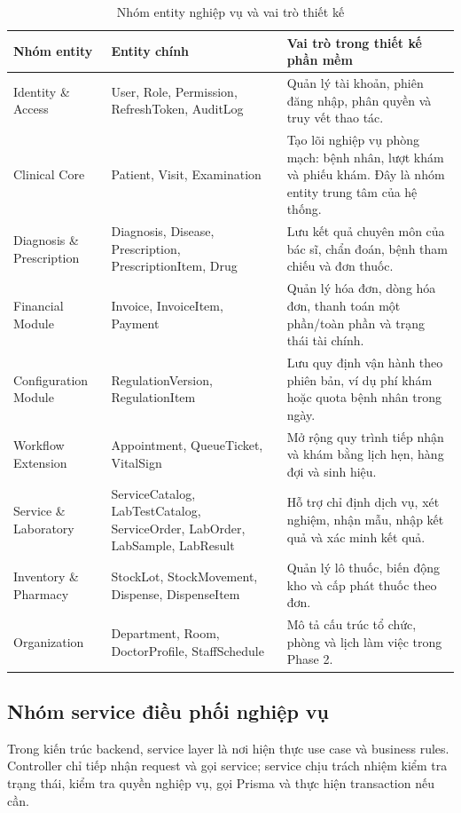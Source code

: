 \begin{longtable}{|p{4cm}|p{5cm}|p{5.5cm}|}
\caption{Nhóm entity nghiệp vụ và vai trò thiết kế}\\
\hline
\textbf{Nhóm entity} & \textbf{Entity chính} & \textbf{Vai trò trong thiết kế phần mềm} \\
\hline
Identity \& Access & User, Role, Permission, RefreshToken, AuditLog & Quản lý tài khoản, phiên đăng nhập, phân quyền và truy vết thao tác. \\
\hline
Clinical Core & Patient, Visit, Examination & Tạo lõi nghiệp vụ phòng mạch: bệnh nhân, lượt khám và phiếu khám. Đây là nhóm entity trung tâm của hệ thống. \\
\hline
Diagnosis \& Prescription & Diagnosis, Disease, Prescription, PrescriptionItem, Drug & Lưu kết quả chuyên môn của bác sĩ, chẩn đoán, bệnh tham chiếu và đơn thuốc. \\
\hline
Financial Module & Invoice, InvoiceItem, Payment & Quản lý hóa đơn, dòng hóa đơn, thanh toán một phần/toàn phần và trạng thái tài chính. \\
\hline
Configuration Module & RegulationVersion, RegulationItem & Lưu quy định vận hành theo phiên bản, ví dụ phí khám hoặc quota bệnh nhân trong ngày. \\
\hline
Workflow Extension & Appointment, QueueTicket, VitalSign & Mở rộng quy trình tiếp nhận và khám bằng lịch hẹn, hàng đợi và sinh hiệu. \\
\hline
Service \& Laboratory & ServiceCatalog, LabTestCatalog, ServiceOrder, LabOrder, LabSample, LabResult & Hỗ trợ chỉ định dịch vụ, xét nghiệm, nhận mẫu, nhập kết quả và xác minh kết quả. \\
\hline
Inventory \& Pharmacy & StockLot, StockMovement, Dispense, DispenseItem & Quản lý lô thuốc, biến động kho và cấp phát thuốc theo đơn. \\
\hline
Organization & Department, Room, DoctorProfile, StaffSchedule & Mô tả cấu trúc tổ chức, phòng và lịch làm việc trong Phase 2. \\
\hline
\end{longtable}

\subsection{Nhóm service điều phối nghiệp vụ}

Trong kiến trúc backend, service layer là nơi hiện thực use case và business rules. Controller chỉ tiếp nhận request và gọi service; service chịu trách nhiệm kiểm tra trạng thái, kiểm tra quyền nghiệp vụ, gọi Prisma và thực hiện transaction nếu cần.

